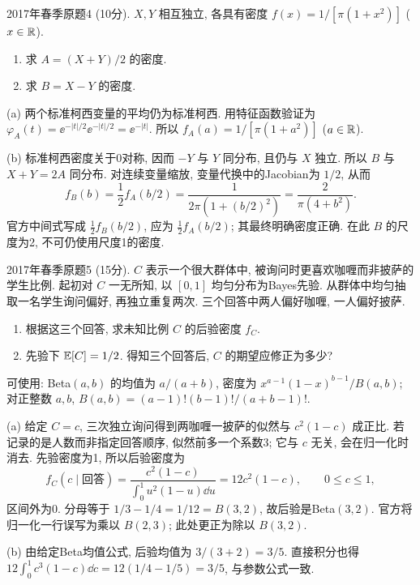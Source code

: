 \begin{exercise}\label{m2:2017s:q4}
2017年春季原题4 (10分). $X,Y$ 相互独立, 各具有密度 $f(x)=1/[\pi(1+x^2)]$ ($x\in\mathbb R$).
\begin{enumerate}
\item[(a)]\label{m2:2017s:q4:a} 求 $A=(X+Y)/2$ 的密度.
\item[(b)]\label{m2:2017s:q4:b} 求 $B=X-Y$ 的密度.
\end{enumerate}
\end{exercise}
\begin{solution}
(a) 两个标准柯西变量的平均仍为标准柯西. 用特征函数验证为 $\varphi_A(t)=\ee^{-|t|/2}\ee^{-|t|/2}=\ee^{-|t|}$. 所以 $f_A(a)=1/[\pi(1+a^2)]$ ($a\in\mathbb R$).

(b) 标准柯西密度关于0对称, 因而 $-Y$ 与 $Y$ 同分布, 且仍与 $X$ 独立. 所以 $B$ 与 $X+Y=2A$ 同分布. 对连续变量缩放, 变量代换中的Jacobian为 $1/2$, 从而
\[
f_B(b)=\frac12 f_A(b/2)=\frac1{2\pi(1+(b/2)^2)}=\frac2{\pi(4+b^2)}.
\]
官方中间式写成 $\frac12 f_B(b/2)$, 应为 $\frac12 f_A(b/2)$; 其最终明确密度正确. 在此 $B$ 的尺度为2, 不可仍使用尺度1的密度.
\end{solution}

\begin{exercise}\label{m2:2017s:q5}
2017年春季原题5 (15分). $C$ 表示一个很大群体中, 被询问时更喜欢咖喱而非披萨的学生比例. 起初对 $C$ 一无所知, 以 $[0,1]$ 均匀分布为Bayes先验. 从群体中均匀抽取一名学生询问偏好, 再独立重复两次. 三个回答中两人偏好咖喱, 一人偏好披萨.
\begin{enumerate}
\item[(a)]\label{m2:2017s:q5:a} 根据这三个回答, 求未知比例 $C$ 的后验密度 $f_C$.
\item[(b)]\label{m2:2017s:q5:b} 先验下 $\mathbb E[C]=1/2$. 得知三个回答后, $C$ 的期望应修正为多少?
\end{enumerate}
可使用: Beta$(a,b)$ 的均值为 $a/(a+b)$, 密度为 $x^{a-1}(1-x)^{b-1}/B(a,b)$; 对正整数 $a,b$, $B(a,b)=(a-1)!(b-1)!/(a+b-1)!$.
\end{exercise}
\begin{solution}
(a) 给定 $C=c$, 三次独立询问得到两咖喱一披萨的似然与 $c^2(1-c)$ 成正比. 若记录的是人数而非指定回答顺序, 似然前多一个系数3; 它与 $c$ 无关, 会在归一化时消去. 先验密度为1, 所以后验密度为
\[
f_C(c\mid\text{回答})=\frac{c^2(1-c)}{\int_0^1u^2(1-u)\dd u}=12c^2(1-c),\qquad0\le c\le1,
\]
区间外为0. 分母等于 $1/3-1/4=1/12=B(3,2)$, 故后验是Beta$(3,2)$. 官方将归一化一行误写为乘以 $B(2,3)$; 此处更正为除以 $B(3,2)$.

(b) 由给定Beta均值公式, 后验均值为 $3/(3+2)=3/5$. 直接积分也得 $12\int_0^1c^3(1-c)\dd c=12(1/4-1/5)=3/5$, 与参数公式一致.
\end{solution}

